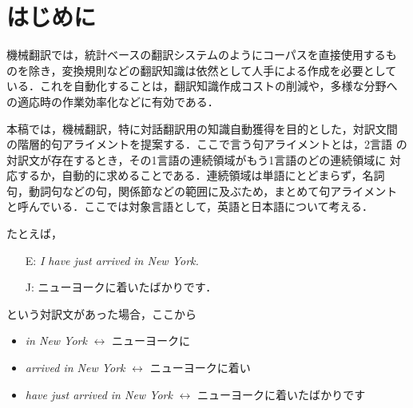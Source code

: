 


\newcommand{\smalltable}{}

\newenvironment{conditionlist}{}{}

\newcommand{\caselist}[1]{}



\maketitle
\thispagestyle{empty}


\section{はじめに}

機械翻訳では，統計ベースの翻訳システムのようにコーパスを直接使用するも
のを除き，変換規則などの翻訳知識は依然として人手による作成を必要として
いる．これを自動化することは，翻訳知識作成コストの削減や，多様な分野へ
の適応時の作業効率化などに有効である．

本稿では，機械翻訳，特に対話翻訳用の知識自動獲得を目的とした，対訳文間
の階層的句アライメントを提案する．ここで言う句アライメントとは，2言語
の対訳文が存在するとき，その1言語の連続領域がもう1言語のどの連続領域に
対応するか，自動的に求めることである．連続領域は単語にとどまらず，名詞
句，動詞句などの句，関係節などの範囲に及ぶため，まとめて句アライメント
と呼んでいる．ここでは対象言語として，英語と日本語について考える．

たとえば，

\begin{itemize}\parskip=0mm\itemindent=20pt
\item[E:] {\em I have just arrived in New York.}
\item[J:] {ニューヨークに着いたばかりです．}
\end{itemize}

\noindent
という対訳文があった場合，ここから

\begin{itemize}\itemindent=20pt\parskip=0mm
\item {\em in New York} $\leftrightarrow$ {ニューヨークに}
\item {\em arrived in New York} $\leftrightarrow$ {ニューヨークに着い}
\item {\em have just arrived in New York} $\leftrightarrow$ 
	 {ニューヨークに着いたばかりです}
\end{itemize}

